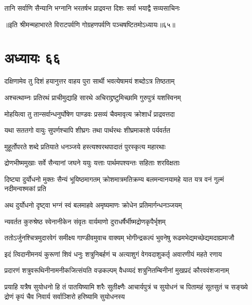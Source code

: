 \twolineshloka
{तानि सर्वाणि सैन्यानि भग्नानि भरतर्षभ}
{प्राद्रवन्त दिशः सर्वा भयाद्वै सव्यसाचिनः}

॥इति श्रीमन्महाभारते विराटपर्वणि गोग्रहणपर्वणि पञ्चषष्टितमोऽध्यायः॥६५॥

\chapter{अध्यायः ६६}

\twolineshloka
{दक्षिणामेव तु दिशं हयानुत्तर वाहय}
{पुरा सार्थी भवत्येषामयं शब्दोऽत्र तिष्ठताम्}


\twolineshloka
{अश्चत्थाम्नः प्रतिरथं प्राचीमुद्याहि सारथे}
{अचिराद्द्रष्टुमिच्छामि गुरुपुत्रं यशस्विनम्}



\twolineshloka
{मोहयित्वा तु तान्सर्वान्धनुर्घोषेण पाण्डवः}
{प्रसव्यं चैवमावृत्य क्रोशार्धं प्राद्रवत्तदा}


\twolineshloka
{यथा सततगो वायुः सुपर्णश्चापि शीघ्रगः}
{तथा पार्थरथः शीघ्रमाकाशे पर्यवर्तत}


\twolineshloka
{मुहूर्तोपरते शब्दे प्रतियाते धनञ्जये}
{हस्त्यश्वरथपादातं पुरस्कृत्य महारथाः}


\twolineshloka
{द्रोणभीष्ममुखाः सर्वे सैन्यानां जघने ययुः}
{यत्ताः पार्थमपश्यन्तः सहिताः शरविक्षताः}




\threelineshloka
{दिष्ट्या दुर्योधनो मुक्तः सैन्यं भूयिष्ठमागतम्}
{क्रोशमात्रमतिक्रम्य बलमन्वानयामहे}
{यात यत्र वनं गुल्मं नदीमन्वश्मकां प्रति}



\twolineshloka
{अथ दुर्योधनो दृष्ट्वा भग्नं स्वं बलमाहवे}
{अमृष्यमाणः क्रोधेन प्रतिमार्गन्धनञ्जयम्}


\twolineshloka
{न्यवर्तत कुरुश्रेष्ठ स्वेनानीकेन संवृतः}
{वार्यमाणो दुराधर्षैर्भीष्मद्रोणकृपैर्भृशम्}


\twolineshloka
{ततोऽर्जुनश्चित्रमुदारवेगं समीक्ष्य गाण्डीवमुवाच वाक्यम्}
{भोगीन्द्रकल्पं भुवनेषु रूढमभेद्यमच्छेद्यमदाह्यमाजौ}


\twolineshloka
{इदं त्विदानीमनयं कुरूणां शिवं धनुः शत्रुनिबर्हणं च}
{अत्याशुगं वेगवदाशुकर्तृ अवारणीयं महते रणाय}


\twolineshloka
{प्रदारणं शत्रुवरूथिनीनामनीकजित्संयति वज्रकल्पम्}
{वैधव्यदं शत्रुनितम्बिनीनां मुखप्रदं कौरववंशजानाम्}


\threelineshloka
{प्रयाहि यत्रैष सुयोधनो हि तं पातयिष्यामि शरैः सुतीक्ष्णैः}
{आचार्यपुत्रं च सुयोधनं च पितामहं सूतसुतं च सङ्ख्ये}
{द्रोणं कृपं चैव निवार्य सर्वाञ्शिरो हरिष्यामि सुयोधनस्य}



